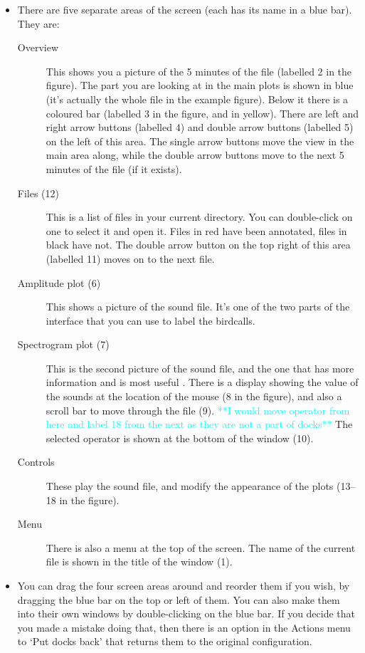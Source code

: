 \documentclass{article}
\begin{document}
\begin{itemize}
\item There are five separate areas of the screen (each has its name in a blue bar). They are:
	\begin{description}
	\item[Overview] This shows you a picture of the 5 minutes of the file (labelled 2 in the figure). The part you are looking at in the main plots is shown in blue (it's actually the whole file in the example figure). Below it there is a coloured bar (labelled 3 in the figure, and in yellow). There are left and right arrow buttons (labelled 4) and double arrow buttons (labelled 5) on the left of this area. The single arrow buttons move the view in the main area along, while the double arrow buttons move to  the next 5 minutes of the file (if it exists). 
	\item [Files (12)] This is a list of files in your current directory. You can double-click on one to select it and open it. Files in red have been annotated, files in black have not. The double arrow button on the top right of this area (labelled 11) moves on to the next file.
	\item[Amplitude plot (6)] This shows a picture of the sound file. It's one of the two parts of the interface that you can use to label the birdcalls. 
	\item[Spectrogram plot (7)] This is the second picture of the sound file, and the one that has more information and is most useful . There is a display showing the value of the sounds at the location of the mouse (8 in the figure), and also a scroll bar to move through the file (9). \textcolor{cyan}{**I would move operator from here and label 18 from the next as they are not a part of docks**} The selected operator is shown at the bottom of the window (10).
	\item[Controls] These play the sound file, and modify the appearance of the plots (13--18 in the figure).
	\item[Menu] There is also a menu at the top of the screen. The name of the current file is shown in the title of the window (1).
	\end{description}

\item You can drag the four screen areas around and reorder them if you wish, by dragging the blue bar on the top or left of them. You can also make them into their own windows by double-clicking on the blue bar. If you decide that you made a mistake doing that, then there is an option in the Actions menu to `Put docks back' that returns them to the original configuration.


\end{itemize}
\end{document}
